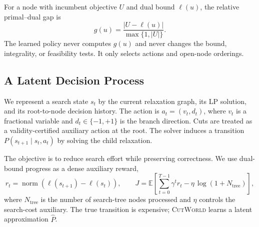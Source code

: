 \documentclass{article}
\newtheorem{remark}{Remark}
\newcommand{\CutWorld}{\textsc{CutWorld}}
\begin{document}
For a node with incumbent objective $U$ and dual bound $\ell(u)$, the relative primal--dual gap is
\begin{equation}
  g(u)=\frac{|U-\ell(u)|}{\max\{1,|U|\}} .
  \label{eq:gap}
\end{equation}
The learned policy never computes $g(u)$ and never changes the bound, integrality, or feasibility tests. It only selects actions and open-node orderings.



\subsection{A Latent Decision Process}

We represent a search state $s_t$ by the current relaxation graph, its LP
solution, and its root-to-node decision history. The action is
$a_t=(v_t,d_t)$, where $v_t$ is a fractional variable and
$d_t\in\{-1,+1\}$ is the branch direction. Cuts are treated as a
validity-certified auxiliary action at the root. The solver induces a
transition $P(s_{t+1}\mid s_t,a_t)$ by solving the child relaxation.

The objective is to reduce search effort while preserving correctness. We use
dual-bound progress as a dense auxiliary reward,
\begin{equation}
  r_t=\operatorname{norm}\!\left(\ell(s_{t+1})-\ell(s_t)\right),
  \qquad
  J=\mathbb{E}\!\left[\sum_{t=0}^{T-1}\gamma^t r_t
      -\eta\,\log(1+N_{\mathrm{tree}})\right],
  \label{eq:mdp-return}
\end{equation}
where $N_{\mathrm{tree}}$ is the number of search-tree nodes processed and
$\eta$ controls the search-cost auxiliary. The true transition is expensive;
\CutWorld{} learns a latent approximation $\widehat P$.
\end{document}
